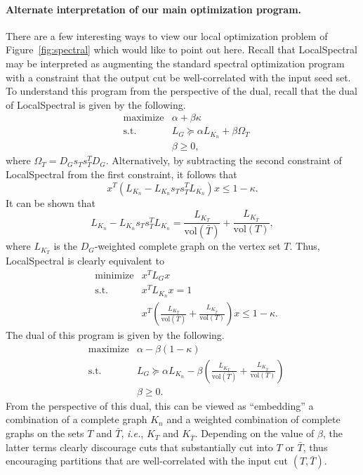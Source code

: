 \documentclass[11pt]{article}
\newcommand{\vol}{\mathrm{vol}}
\begin{document}
\paragraph{Alternate interpretation of our main optimization program.}
There are a few interesting ways to view our local optimization problem 
of Figure~\ref{fig:spectral} which would like to point out here. 
Recall that \textsf{LocalSpectral} may be interpreted as augmenting the 
standard spectral optimization program with a constraint that the output 
cut be well-correlated with the input seed set.
To understand this program from the perspective of the dual, recall that 
the dual of \textsf{LocalSpectral} is given by the following.
\begin{eqnarray*}
\label{prog:spectral-local-d1}
                     &\text{maximize} & \alpha + \beta \kappa                    \\
                     &\text{s.t.} & L_{G} \succeq \alpha L_{K_n} + \beta \Omega_T \\
                     &            & \beta \ge 0    ,
\end{eqnarray*}
where $\Omega_T=D_Gs_Ts_T^TD_G$.
Alternatively, by subtracting the second constraint of 
\textsf{LocalSpectral} 
from the first constraint, it follows that
$$
x^T\left(L_{K_n}-L_{K_n}s_Ts_T^TL_{K_n}\right)x \le 1-\kappa  .
$$
It can be shown that
$$
L_{K_n}-L_{K_n}s_Ts_T^TL_{K_n} 
   = \frac{L_{K_{T}}}{\vol(\bar{T})} + \frac{L_{K_{\bar{T}}}}{\vol(T)}  ,
$$
where $L_{K_{T}}$ is the $D_G$-weighted complete graph on the vertex set $T$.
Thus,
\textsf{LocalSpectral}
is clearly equivalent to
\begin{eqnarray*}
\label{prog:spectral-local-p2}
                              &\text{minimize} & x^T  L_{G} x                \\
                              &\text{s.t.} & x^T  L_{K_n} x = 1      \\
                              &            & x^T\left( \frac{L_{K_{T}}}{\vol(\bar{T})} + \frac{L_{K_{\bar{T}}}}{\vol(T)} \right)x \le 1-\kappa   .
\end{eqnarray*}
The dual of 
this program 
is given by the following.
\begin{eqnarray*}
\label{prog:spectral-local-d2A}
                             &\text{maximize} & \alpha - \beta(1-\kappa)   \\
\label{prog:spectral-local-d2B}
                             &\text{s.t.} & L_{G} \succeq \alpha L_{K_n} - \beta\left( \frac{L_{K_{T}}}{\vol(\bar{T})} + \frac{L_{K_{\bar{T}}}}{\vol(T)} \right)  \\
\label{prog:spectral-local-d2C}
                             &            & \beta \ge 0      . 
\end{eqnarray*}
From the perspective of this dual, this 
can be viewed as ``embedding'' a combination of a complete graph $K_n$ and a
weighted combination of complete graphs on the sets $T$ and $\bar{T}$, 
\emph{i.e.}, $K_T$ and $K_{\bar{T}}$.
Depending on the value of $\beta$, the latter terms clearly discourage cuts 
that substantially cut into $T$ or $\bar{T}$, thus encouraging partitions
that are well-correlated with the input cut $(T,\bar{T})$.
\end{document}
